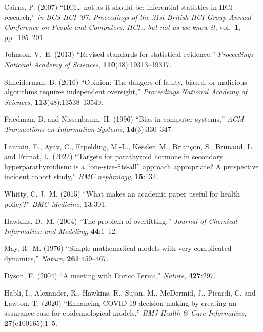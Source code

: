 \documentclass{comjnl}
\begin{document}
{\begin{thebibliography}{100}
Cairns, P. (2007) ``{HCI}{\ldots} not as it should be: inferential statistics
  in {HCI} research,'' {\em in BCS-HCI '07: Proceedings of the 21st {British}
  {HCI} {Group} Annual {Conference on People and Computers}: {HCI}{\ldots} but
  not as we know it}, vol.~\textbf{1}, pp.~195--201.

Johnson, V.~E. (2013) ``Revised standards for statistical evidence,'' {\em
  Proceedings National Academy of Sciences}, \textbf{110}(48):19313--19317.
\newblock {}

Shneiderman, B. (2016) ``Opinion: {The} dangers of faulty, biased, or malicious
  algorithms requires independent oversight,'' {\em Proceedings National
  Academy of Sciences}, \textbf{113}(48):13538--13540.
\newblock {}

Friedman, B. and Nissenbaum, H. (1996) ``Bias in computer systems,'' {\em ACM
  Transactions on Information Systems}, \textbf{14}(3):330--347.
\newblock {}

Laurain, E., Ayav, C., Erpelding, M.-L., Kessler, M., Brian{\c{c}}on, S.,
  Brunaud, L. and Frimat, L. (2022) ``Targets for parathyroid hormone in
  secondary hyperparathyroidism: is a ``one-size-fits-all'' approach
  appropriate? {A} prospective incident cohort study,'' {\em BMC nephrology},
  \textbf{15}:132.
\newblock {}

Whitty, C. J.~M. (2015) ``What makes an academic paper useful for health
  policy?'' {\em BMC Medicine}, \textbf{13}:301.
\newblock {}

Hawkins, D.~M. (2004) ``The problem of overfitting,'' {\em Journal of Chemical
  Information and Modeling}, \textbf{44}:1--12.
\newblock {}

May, R.~M. (1976) ``Simple mathematical models with very complicated
  dynamics,'' {\em Nature}, \textbf{261}:459--467.
\newblock {}

Dyson, F. (2004) ``A meeting with {Enrico Fermi},'' {\em Nature},
  \textbf{427}:297.
\newblock {}

Habli, I., Alexander, R., Hawkins, R., Sujan, M., McDermid, J., Picardi, C. and
  Lawton, T. (2020) ``Enhancing {COVID-19} decision making by creating an
  assurance case for epidemiological models,'' {\em BMJ Health {\&} Care
  Informatics}, \textbf{27}(e100165):1--5.
\newblock {}


\end{thebibliography}}
\end{document}
